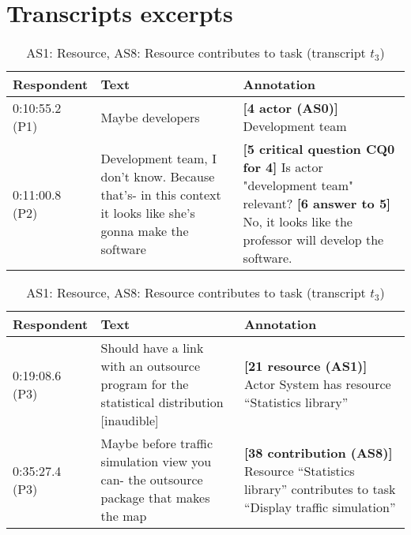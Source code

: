 \section{Transcripts excerpts}
\label{sect:transcripts:excerpts}

\begin{table}[!htbp]
\centering
\begin{tabular}{|p{20mm}|p{70mm}|p{60mm}|}
\hline
Respondent & Text & Annotation\\
\hline
0:10:55.2 (P1) & Maybe developers &\textbf{[4 actor (AS0)]} Development team\\
\hline
0:11:00.8 (P2) & Development team, I don't know. Because that's- in this context it looks like she's gonna make the software & \textbf{[5 critical question CQ0 for 4]} Is actor "development team" relevant?\newline
\textbf{[6 answer to 5]} No, it looks like the professor will develop the software.\\
\hline
\end{tabular}
\caption{AS0: Actor, CQ0: Relevant actor? (transcript $t_3$)}
\label{table:transcript:irrelevant-actor}

\begin{tabular}{|p{20mm}|p{70mm}|p{60mm}|}
\hline
Respondent & Text & Annotation\\
\hline
0:19:08.6 (P3) & Should have a link with an outsource program for the statistical distribution [inaudible] & \textbf{[21 resource (AS1)]} Actor System has resource ``Statistics library''\\
\hline
0:35:27.4 (P3) & Maybe before traffic simulation view you can- the outsource package that makes the map	& \textbf{[38 contribution (AS8)]} Resource ``Statistics library'' contributes to task ``Display traffic simulation''\\
\hline
\end{tabular}
\caption{AS1: Resource, AS8: Resource contributes to task (transcript $t_3$)}
\label{table:transcript:as1-as8}


\end{table}

